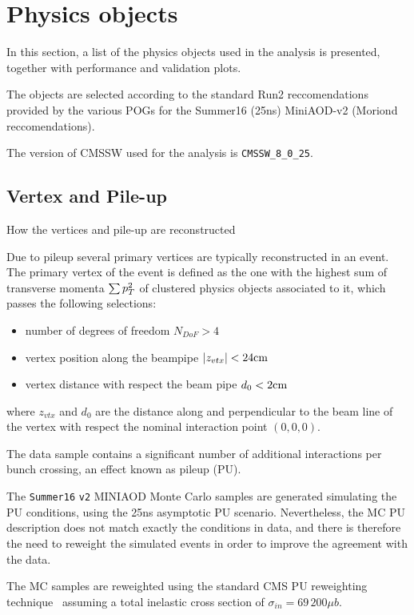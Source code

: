 \chapter{Physics objects}
\label{sec:objects}

In this section, a list of the physics objects used in the analysis is presented, together with performance and validation plots. 

The objects are selected according to the standard Run2 reccomendations provided by the various POGs for the Summer16 (25ns) MiniAOD-v2 (Moriond reccomendations).

The version of CMSSW used for the analysis is {\tt CMSSW\_8\_0\_25}.

\section{Vertex and Pile-up}
{\color{red} How the vertices and pile-up are reconstructed}

Due to pileup several primary vertices are typically reconstructed in an event.
The primary vertex of the event is defined as the one with the highest sum of transverse momenta $\sum p_T^2$ of clustered physics objects associated to it, which passes the following selections:
\begin{itemize}
  \item number of degrees of freedom $N_{DoF}>4$
  \item vertex position along the beampipe $|z_{vtx}|<24\text{cm}$
  \item vertex distance with respect the beam pipe $d_0<2\text{cm}$
\end{itemize}
where $z_{vtx}$ and $d_0$ are the distance along and perpendicular to the beam line of the vertex with respect the nominal interaction point $(0,0,0)$.

The data sample contains a significant number of additional interactions per bunch crossing, an effect known as pileup (PU). 

The {\tt Summer16} \texttt{v2} MINIAOD Monte Carlo samples are generated simulating the PU conditions, using the 25ns asymptotic PU scenario. 
Nevertheless, the MC PU description does not match exactly the conditions in data, and there is therefore the need to reweight the simulated events in order to improve the agreement with the data. 

The MC samples are reweighted using the standard CMS PU reweighting technique~\cite{bib:pureweight,bib:pureweight2} assuming a total inelastic cross section of $\sigma_{in} = 69\,200 \mu b$.

